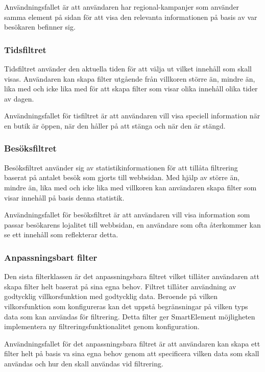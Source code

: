 Användningsfallet är att användaren har regional-kampanjer som använder samma element på sidan för att visa den relevanta informationen på basis av var besökaren befinner sig.

\subsubsection{Tidsfiltret}

Tidsfiltret använder den aktuella tiden för att välja ut vilket innehåll som skall visas. Användaren kan skapa filter utgående från villkoren större än, mindre än, lika med och icke lika med för att skapa filter som visar olika innehåll olika tider av dagen.

Användningsfallet för tisfiltret är att användaren vill visa speciell information när en butik är öppen, när den håller på att stänga och när den är stängd.

\subsubsection{Besöksfiltret}

Besöksfiltret använder sig av statistikinformationen för att tillåta filtrering baserat på antalet besök som gjorts till webbsidan. Med hjälp av större än, mindre än, lika med och icke lika med villkoren kan användaren skapa filter som visar innehåll på basis denna statistik.

Användningsfallet för besöksfiltret är att användaren vill visa information som passar besökarens lojalitet till webbsidan, en användare som ofta återkommer kan se ett innehåll som reflekterar detta.

\subsubsection{Anpassningsbart filter}

Den sista filterklassen är det anpassningsbara filtret vilket tillåter användaren att skapa filter helt baserat på sina egna behov. Filtret tillåter användning av godtycklig villkorsfunktion med godtycklig data. Beroende på vilken vilkorsfunktion som konfigureras kan det uppstå begränsningar på vilken typs data som kan användas för filtrering. Detta filter ger SmartElement möjligheten implementera ny filtreringsfunktionalitet genom konfiguration.

Användningsfallet för det anpassningsbara filtret är att användaren kan skapa ett filter helt på basis va sina egna behov genom att specificera vilken data som skall användas och hur den skall användas vid filtrering.

